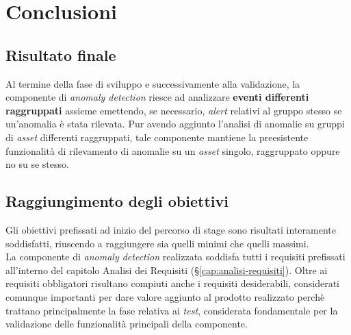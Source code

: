 
\chapter{Conclusioni}
\label{cap:conclusioni}


\section{Risultato finale}
Al termine della fase di sviluppo e successivamente alla validazione, la componente di \textit{anomaly detection} riesce ad analizzare \textbf{eventi differenti raggruppati} assieme emettendo, se necessario, \textit{alert} relativi al gruppo stesso se un'anomalia è stata rilevata. Pur avendo aggiunto l'analisi di anomalie su gruppi di \textit{asset} differenti raggruppati, tale componente mantiene la preesistente funzionalità di rilevamento di anomalie su un \textit{asset} singolo, raggruppato oppure no su se stesso.

\section{Raggiungimento degli obiettivi}
Gli obiettivi prefissati ad inizio del percorso di stage sono risultati interamente soddisfatti, riuscendo a raggiungere sia quelli minimi che quelli massimi.\\
La componente di \textit{anomaly detection} realizzata soddisfa tutti i requisiti prefissati all'interno del capitolo Analisi dei Requisiti (\S\ref{cap:analisi-requisiti}). Oltre ai requisiti obbligatori risultano compiuti anche i requisiti desiderabili, considerati comunque importanti per dare valore aggiunto al prodotto realizzato perchè trattano principalmente la fase relativa ai \textit{test}, considerata fondamentale per la validazione delle funzionalità principali della componente.


